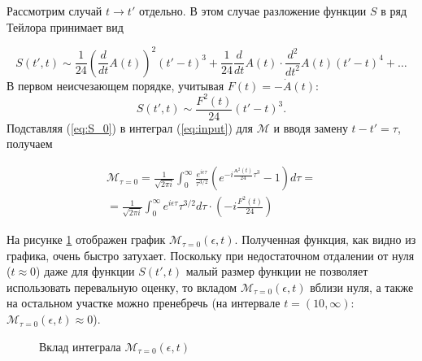 \documentclass[14pt, a4paper]{article}
\numberwithin{figure}{section}
\numberwithin{equation}{section}
\newcommand{\cM}{\mathcal{M}}
\begin{document}
Рассмотрим случай $t \to t'$ отдельно. В этом случае разложение функции $S$ в ряд Тейлора принимает вид

$$ 
S(t', t) \sim \frac{1}{24} \left( \frac{d}{dt}A(t)\right)^{2}(t' - t)^3 + \frac{1}{24} \frac{d}{dt}A(t) \cdot \frac{d^2}{dt^2}A(t) (t' - t)^4 + \ldots
$$
В первом неисчезающем порядке, учитывая $F(t)=-\dot{A}(t)$:
\begin{equation}\label{eq:S_0}
S(t', t) \sim \frac{F^{2}(t)}{24}(t' - t)^3.
\end{equation}
Подставляя (\ref{eq:S_0}) в интеграл (\ref{eq:input}) для $\cM$ и вводя замену $t - t' = \tau$, получаем 

\begin{eqnarray}
\cM_{\tau = 0} = \frac{1}{\sqrt{2\pi i}} \int_{0}^{\infty} \frac{e^{i \epsilon \tau}}{\tau^{3/2}} \left(e^{-i \frac{А^2(t)}{24} \tau^3} - 1\right) d\tau  = \nonumber \\
= \frac{1}{\sqrt{2\pi i}} \int_{0}^{\infty} e^{i \epsilon \tau} \tau^{3/2} d\tau \cdot \left(-i\frac{F^2(t)}{24}\right) 
\label{int:tau0}
\end{eqnarray}

На рисунке \ref{ris:I_0} отображен график $\cM_{\tau = 0}(\epsilon,t)$. 
Полученная функция, как видно из графика, очень быстро затухает. Поскольку при недостаточном отдалении от нуля ($t \approx 0$) даже для функции $S(t', t)$ малый размер функции не позволяет использовать перевальную оценку, то вкладом $\cM_{\tau = 0}(\epsilon, t)$ вблизи нуля, а также на остальном участке можно пренебречь (на интервале $t = (10, \infty)$: $\cM_{\tau = 0}(\epsilon, t) \approx 0$).  

\begin{figure}[h]
	\caption{Вклад интеграла $\cM_{\tau = 0}(\epsilon, t)$}
	\label{ris:I_0}
\end{figure}
\end{document}
